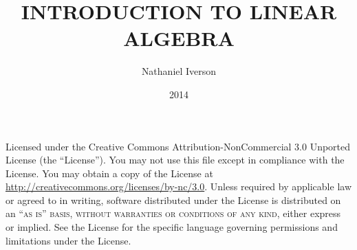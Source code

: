 \documentclass[12pt,fleqn]{fancybook} %
\author{Nathaniel Iverson}
\title{INTRODUCTION TO LINEAR ALGEBRA}
\date{2014}
\begin{document}
\frontmatter

\maketitle

\begin{copyrightpage}
\noindent Licensed under the Creative Commons Attribution-NonCommercial 3.0 Unported License (the ``License''). You may not use this file except in compliance with the License. You may obtain a copy of the License at \url{http://creativecommons.org/licenses/by-nc/3.0}. Unless required by applicable law or agreed to in writing, software distributed under the License is distributed on an \textsc{``as is'' basis, without warranties or conditions of any kind}, either express or implied. See the License for the specific language governing permissions and limitations under the License.\\ %
\end{copyrightpage}

\tableofcontents

\mainmatter


\appendix


%

\backmatter

\nocite{*}



\printindex
\clearpage
{}
\end{document}
